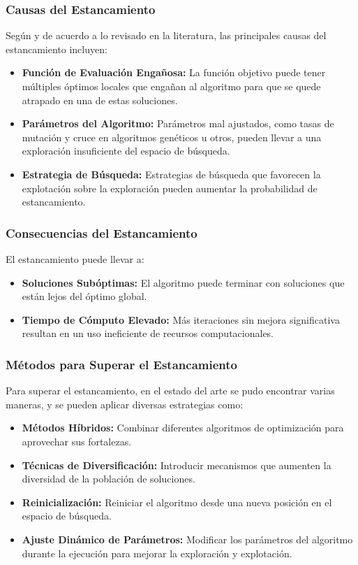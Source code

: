 \subsubsection{Causas del Estancamiento}

Según \cite{Dokeroglu2019_jx} y de acuerdo a lo revisado en la literatura, las principales causas del estancamiento incluyen:
\begin{itemize}
    \item \textbf{Función de Evaluación Engañosa:} La función objetivo puede tener múltiples óptimos locales que engañan al algoritmo para que se quede atrapado en una de estas soluciones.
    \item \textbf{Parámetros del Algoritmo:} Parámetros mal ajustados, como tasas de mutación y cruce en algoritmos genéticos u otros, pueden llevar a una exploración insuficiente del espacio de búsqueda.
    \item \textbf{Estrategia de Búsqueda:} Estrategias de búsqueda que favorecen la explotación sobre la exploración pueden aumentar la probabilidad de estancamiento.
\end{itemize}

\subsubsection{Consecuencias del Estancamiento}

El estancamiento puede llevar a:
\begin{itemize}
    \item \textbf{Soluciones Subóptimas:} El algoritmo puede terminar con soluciones que están lejos del óptimo global.
    \item \textbf{Tiempo de Cómputo Elevado:} Más iteraciones sin mejora significativa resultan en un uso ineficiente de recursos computacionales.
\end{itemize}

\subsubsection{Métodos para Superar el Estancamiento}

Para superar el estancamiento, en el estado del arte se pudo encontrar varias maneras, y se pueden aplicar diversas estrategias como:
\begin{itemize}
    \item \textbf{Métodos Híbridos:} Combinar diferentes algoritmos de optimización para aprovechar sus fortalezas.
    \item \textbf{Técnicas de Diversificación:} Introducir mecanismos que aumenten la diversidad de la población de soluciones.
    \item \textbf{Reinicialización:} Reiniciar el algoritmo desde una nueva posición en el espacio de búsqueda.
    \item \textbf{Ajuste Dinámico de Parámetros:} Modificar los parámetros del algoritmo durante la ejecución para mejorar la exploración y explotación.
\end{itemize}

